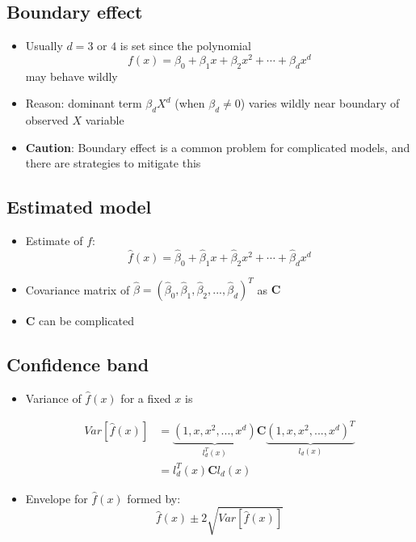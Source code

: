 \documentclass[]{article}
\providecommand{\tightlist}{%
  \setlength{\itemsep}{0pt}\setlength{\parskip}{0pt}}
\begin{document}
\subsection{Boundary effect}\label{boundary-effect}

\begin{itemize}
\item
  Usually \(d=3\) or \(4\) is set since the polynomial \[
  f\left(  x\right)  =\beta_{0}+\beta_{1}x+\beta_{2}x^{2}+\cdots+\beta_{d}x^{d}
  \] may behave wildly
\item
  Reason: dominant term \(\beta_{d}X^{d}\) (when \(\beta_{d}\neq0\))
  varies wildly near boundary of observed \(X\) variable
\item
  \textbf{Caution}: Boundary effect is a common problem for complicated
  models, and there are strategies to mitigate this
\end{itemize}

\subsection{Estimated model}\label{estimated-model}

\begin{itemize}
\item
  Estimate of \(f\): \[
  \hat{f}\left(  x\right)  =\hat{\beta}_{0}+\hat{\beta}_{1}x+\hat{\beta}%
  _{2}x^{2}+\cdots+\hat{\beta}_{d}x^{d}
  \]
\item
  Covariance matrix of
  \(\hat{\beta}=\left( \hat{\beta}_{0} ,\hat{\beta}_{1},\hat{\beta}_{2},...,\hat{\beta}_{d}\right) ^{T}\)
  as \(\mathbf{C}\)
\item
  \(\mathbf{C}\) can be complicated
\end{itemize}

\subsection{Confidence band}\label{confidence-band}

\begin{itemize}
\tightlist
\item
  Variance of \(\hat{f}\left(x\right)\) for a fixed \(x\) is

  \begin{align*}
  Var\left[  \hat{f}\left(  x\right)  \right]   &  =\underbrace{\left(
  1,x,x^{2},...,x^{d}\right)  }_{l_{d}^{T}\left(  x\right)  }\mathbf{C}%
  \underbrace{\left(  1,x,x^{2},...,x^{d}\right)  ^{T}}_{l_{d}\left(  x\right)
  }\\
  &  =l_{d}^{T}\left(  x\right)  \mathbf{C}l_{d}\left(  x\right)
  \end{align*}
\item
  Envelope for \(\hat{f}\left( x\right)\) formed by: \[
  \hat{f}\left(  x\right)  \pm 2\sqrt{Var\left[
  \hat{f}\left(  x\right)  \right]  }
  \]
\end{itemize}
\end{document}
